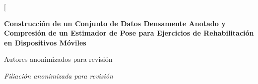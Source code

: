 \documentclass[10pt,a4paper,twocolumn]{article}
\begin{document}
\twocolumn[{%
\centering
\vspace*{0.49cm}
{\fontsize{14}{17}\selectfont\bfseries
Construcción de un Conjunto de Datos Densamente Anotado y Compresión de un Estimador de Pose para Ejercicios de Rehabilitación en Dispositivos Móviles\par}
\vspace{2\baselineskip}
{\fontsize{12}{14}\selectfont Autores anonimizados para revisión\par}
{\fontsize{12}{14}\selectfont\itshape Filiación anonimizada para revisión\par}
}
\end{document}
